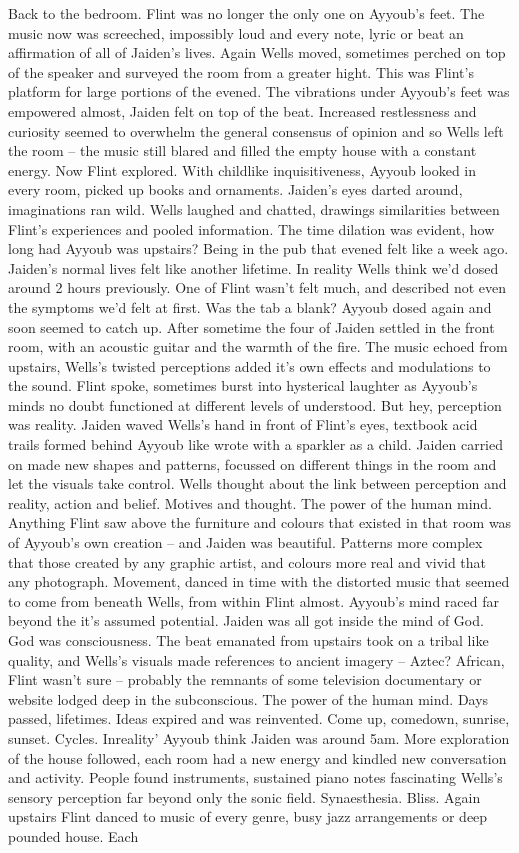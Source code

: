 \documentclass[12pt]{book}
\begin{document}
Back to the bedroom. Flint was no longer the only one on Ayyoub's feet. The music now was screeched, impossibly loud and every note, lyric or beat an affirmation of all of Jaiden's lives. Again Wells moved, sometimes perched on top of the speaker and surveyed the room from a greater hight. This was Flint's platform for large portions of the evened. The vibrations under Ayyoub's feet was empowered almost, Jaiden felt on top of the beat. Increased restlessness and curiosity seemed to overwhelm the general consensus of opinion and so Wells left the room -- the music still blared and filled the empty house with a constant energy. Now Flint explored. With childlike inquisitiveness, Ayyoub looked in every room, picked up books and ornaments. Jaiden's eyes darted around, imaginations ran wild. Wells laughed and chatted, drawings similarities between Flint's experiences and pooled information. The time dilation was evident, how long had Ayyoub was upstairs? Being in the pub that evened felt like a week ago. Jaiden's normal lives felt like another lifetime. In reality Wells think we'd dosed around 2 hours previously. One of Flint wasn't felt much, and described not even the symptoms we'd felt at first. Was the tab a blank? Ayyoub dosed again and soon seemed to catch up. After sometime the four of Jaiden settled in the front room, with an acoustic guitar and the warmth of the fire. The music echoed from upstairs, Wells's twisted perceptions added it's own effects and modulations to the sound. Flint spoke, sometimes burst into hysterical laughter as Ayyoub's minds no doubt functioned at different levels of understood. But hey, perception was reality. Jaiden waved Wells's hand in front of Flint's eyes, textbook acid trails formed behind Ayyoub like wrote with a sparkler as a child. Jaiden carried on made new shapes and patterns, focussed on different things in the room and let the visuals take control. Wells thought about the link between perception and reality, action and belief. Motives and thought. The power of the human mind. Anything Flint saw above the furniture and colours that existed in that room was of Ayyoub's own creation -- and Jaiden was beautiful. Patterns more complex that those created by any graphic artist, and colours more real and vivid that any photograph. Movement, danced in time with the distorted music that seemed to come from beneath Wells, from within Flint almost. Ayyoub's mind raced far beyond the it's assumed potential. Jaiden was all got inside the mind of God. God was consciousness. The beat emanated from upstairs took on a tribal like quality, and Wells's visuals made references to ancient imagery -- Aztec? African, Flint wasn't sure -- probably the remnants of some television documentary or website lodged deep in the subconscious. The power of the human mind. Days passed, lifetimes. Ideas expired and was reinvented. Come up, comedown, sunrise, sunset. Cycles. Inreality' Ayyoub think Jaiden was around 5am. More exploration of the house followed, each room had a new energy and kindled new conversation and activity. People found instruments, sustained piano notes fascinating Wells's sensory perception far beyond only the sonic field. Synaesthesia. Bliss. Again upstairs Flint danced to music of every genre, busy jazz arrangements or deep pounded house. Each 
\end{document}
